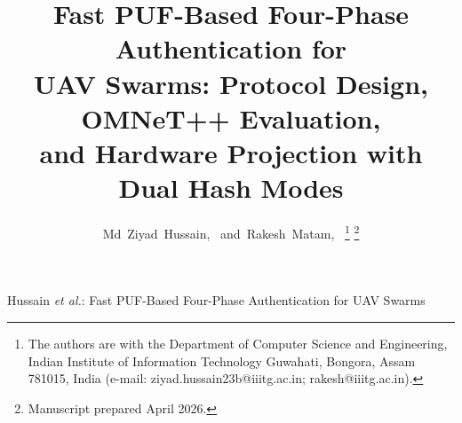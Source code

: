 \documentclass[journal,a4paper,10pt]{IEEEtran}
\begin{document}
\title{Fast PUF-Based Four-Phase Authentication for\\
UAV Swarms: Protocol Design, OMNeT++ Evaluation,\\
and Hardware Projection with Dual Hash Modes}

\author{Md~Ziyad~Hussain,~
        and~Rakesh~Matam,~%
\thanks{The authors are with the Department of Computer Science and
Engineering, Indian Institute of Information Technology Guwahati,
Bongora, Assam 781015, India
(e-mail: ziyad.hussain23b@iiitg.ac.in; rakesh@iiitg.ac.in).}%
\thanks{Manuscript prepared April 2026.}}

%
{Hussain \MakeLowercase{\textit{et al.}}: Fast PUF-Based Four-Phase
Authentication for UAV Swarms}


\maketitle
\end{document}
